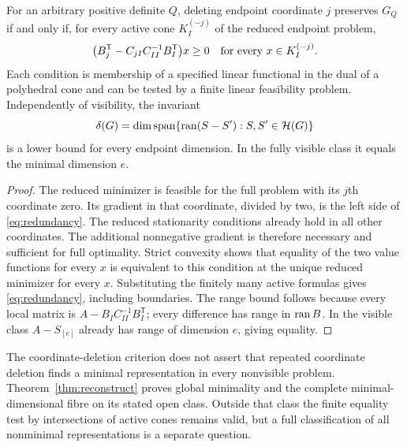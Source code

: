 \begin{proposition}\label{prop:redundancy}
For an arbitrary positive definite $Q$, deleting endpoint coordinate $j$ preserves $G_Q$ if and only if, for every active cone $K_I^{(-j)}$ of the reduced endpoint problem,
\begin{equation}\label{eq:redundancy}
 \bigl(B_j^{\mathsf T}-C_{jI}C_{II}^{-1}B_I^{\mathsf T}\bigr)x\ge0
 \quad\hbox{for every }x\in K_I^{(-j)}.
\end{equation}
Each condition is membership of a specified linear functional in the dual of a polyhedral cone and can be tested by a finite linear feasibility problem. Independently of visibility, the invariant
\[
 \delta(G)=\dim\operatorname{span}\{\operatorname{ran}(S-S'):S,S'\in\mathcal H(G)\}
\]
is a lower bound for every endpoint dimension. In the fully visible class it equals the minimal dimension $e$.
\end{proposition}
\begin{proof}
The reduced minimizer is feasible for the full problem with its $j$th coordinate zero. Its gradient in that coordinate, divided by two, is the left side of \eqref{eq:redundancy}. The reduced stationarity conditions already hold in all other coordinates. The additional nonnegative gradient is therefore necessary and sufficient for full optimality. Strict convexity shows that equality of the two value functions for every $x$ is equivalent to this condition at the unique reduced minimizer for every $x$. Substituting the finitely many active formulas gives \eqref{eq:redundancy}, including boundaries. The range bound follows because every local matrix is $A-B_IC_{II}^{-1}B_I^{\mathsf T}$; every difference has range in $\operatorname{ran} B$. In the visible class $A-S_{[e]}$ already has range of dimension $e$, giving equality.
\end{proof}
The coordinate-deletion criterion does not assert that repeated coordinate deletion finds a minimal representation in every nonvisible problem. Theorem~\ref{thm:reconstruct} proves global minimality and the complete minimal-dimensional fibre on its stated open class. Outside that class the finite equality test by intersections of active cones remains valid, but a full classification of all nonminimal representations is a separate question.

